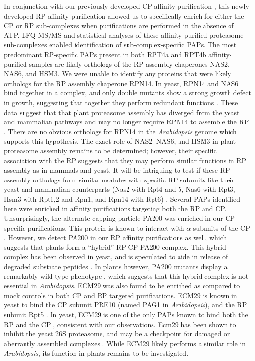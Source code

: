 	In conjunction with our previously developed CP affinity purification \citep{book10}, this newly developed RP affinity purification allowed us to specifically enrich for either the CP or RP sub-complexes when purifications are performed in the absence of ATP. LFQ-MS/MS and statistical analyses of these affinity-purified proteasome sub-complexes enabled identification of sub-complex-specific PAPs. The most predominant RP-specific PAPs present in both RPT4a and RPT4b affinity-purified samples are likely orthologs of the RP assembly chaperones NAS2, NAS6, and HSM3. We were unable to identify any proteins that were likely orthologs for the RP assembly chaperone RPN14. In yeast, RPN14 and NAS6 bind together in a complex, and only double mutants show a strong growth defect in growth, suggesting that together they perform redundant functions \citep{funakoshi09}. These data suggest that that plant proteasome assembly has diverged from the yeast and mammalian pathways and may no longer require RPN14 to assemble the RP \citep{funakoshi09}. There are no obvious orthologs for RPN14 in the \textit{Arabidopsis} genome \citep{book10} which supports this hypothesis. The exact role of NAS2, NAS6, and HSM3 in plant proteasome assembly remains to be determined; however, their specific association with the RP suggests that they may perform similar functions in RP assembly as in mammals and yeast. It will be intriguing to test if these RP assembly orthologs form similar modules with specific RP subunits like their yeast and mammalian counterparts (Nas2 with Rpt4 and 5, Nas6 with Rpt3, Hsm3 with Rpt1,2 and Rpn1, and Rpn14 with Rpt6) \citep{park10}.   
Several PAPs identified here were enriched in affinity purifications targeting both the RP and CP. Unsurprisingly, the alternate capping particle PA200 was enriched in our CP-specific purifications. This protein is known to interact with $\alpha$-subunits of the CP \citep{ortega05}. However, we detect PA200 in our RP affinity purifications as well, which suggests that plants form a “hybrid” RP-CP-PA200 complex. This hybrid complex has been observed in yeast, and is speculated to aide in release of degraded substrate peptides \citep{ortega05, schmidt05, ustrell02}. In plants however, PA200 mutants display a remarkably wild-type phenotype \citep{book10}, which suggests that this hybrid complex is not essential in \textit{Arabidopsis}. ECM29 was also found to be enriched as compared to mock controls in both CP and RP targeted purifications. ECM29 is known in yeast to bind the CP subunit PRE10 (named PAG1 in \textit{Arabidopsis}), and the RP subunit Rpt5 \citep{wani16}. In yeast, ECM29 is one of the only PAPs known to bind both the RP and the CP \citep{lehmann10}, consistent with our observations. Ecm29 has been shown to inhibit the yeast 26S proteasome, and may be a checkpoint for damaged or aberrantly assembled complexes \citep{lehmann10}. While ECM29 likely performs a similar role in \textit{Arabidopsis}, its function in plants remains to be investigated.

